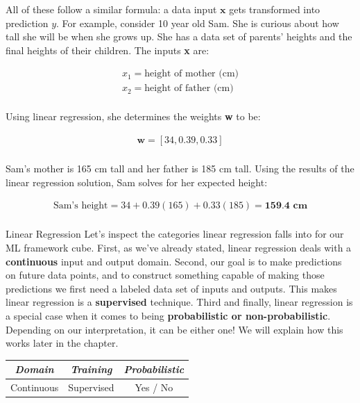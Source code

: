
All of these follow a similar formula: a data input $\textbf{x}$ gets transformed into prediction $y$. For example, consider 10 year old Sam. She is curious about how tall she will be when she grows up. She has a data set of parents' heights and the final heights of their children. The inputs \textbf{x} are:

\begin{align*}
x_{1} = \text{height of mother (cm)} \\
x_{2} = \text{height of father (cm)} \\
\end{align*}

Using linear regression, she determines the weights \textbf{w} to be:

\begin{align*}
\textbf{w} = [34, 0.39, 0.33] \\
\end{align*}

Sam's mother is 165 cm tall and her father is 185 cm tall. Using the results of the linear regression solution, Sam solves for her expected height:

\begin{align*}
\text{Sam's height} = 34 + 0.39(165) + 0.33(185) = \textbf{159.4 cm} \\
\end{align*}

\begin{mlcube}{Linear Regression}
Let's inspect the categories linear regression falls into for our ML framework cube. First, as we've already stated, linear regression deals with a \textbf{continuous} input and output domain. Second, our goal is to make predictions on future data points, and to construct something capable of making those predictions we first need a labeled data set of inputs and outputs. This makes linear regression is a \textbf{supervised} technique. Third and finally, linear regression is a special case when it comes to being \textbf{probabilistic or non-probabilistic}. Depending on our interpretation, it can be either one! We will explain how this works later in the chapter.
\begin{center}
    \begin{tabular}{c|c|c}
    \textit{\textbf{Domain}} & \textit{\textbf{Training}} & \textit{\textbf{Probabilistic}} \\
    \hline
    Continuous & Supervised & Yes / No \\
    \end{tabular}
\end{center}
\end{mlcube}

